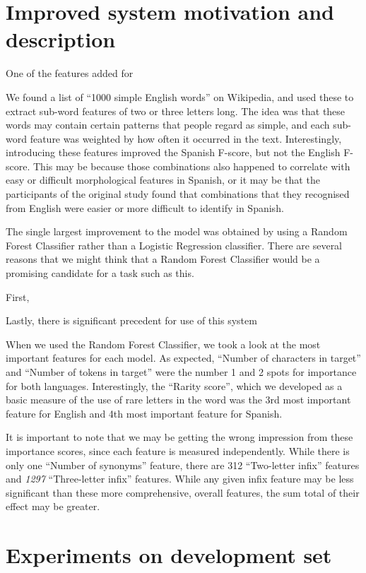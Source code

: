 \documentclass[11pt,a4paper]{article}
\begin{document}
\section{Improved system motivation and description}
One of the features added for 

We found a list of \enquote{1000 simple English words} on Wikipedia, and used these to extract sub-word features of two or three letters long. The idea was that these words may contain certain patterns that people regard as simple, and each sub-word feature was weighted by how often it occurred in the text. Interestingly, introducing these features improved the Spanish F-score, but not the English F-score. This may be because those combinations also happened to correlate with easy or difficult morphological features in Spanish, or it may be that the participants of the original study found that combinations that they recognised from English were easier or more difficult to identify in Spanish.

The single largest improvement to the model was obtained by using a Random Forest Classifier rather than a Logistic Regression classifier. There are several reasons that we might think that a Random Forest Classifier would be a promising candidate for a task such as this. 

First, \cite{treeratpituk2009disambiguating}

Lastly, there is significant precedent for use of this system

When we used the Random Forest Classifier, we took a look at the most important features for each model. As expected, \enquote{Number of characters in target} and \enquote{Number of tokens in target} were the number 1 and 2 spots for importance for both languages. Interestingly, the \enquote{Rarity score}, which we developed as a basic measure of the use of rare letters in the word was the 3rd most important feature for English and 4th most important feature for Spanish. 

It is important to note that we may be getting the wrong impression from these importance scores, since each feature is measured independently. While there is only one \enquote{Number of synonyms} feature, there are 312 \enquote{Two-letter infix} features and \textit{1297} \enquote{Three-letter infix} features. While any given infix feature may be less significant than these more comprehensive, overall features, the sum total of their effect may be greater.


\section{Experiments on development set}
\end{document}
